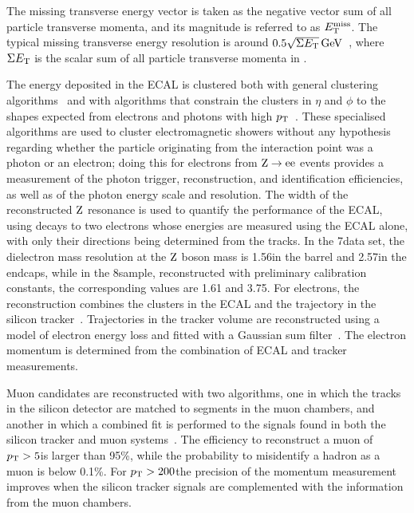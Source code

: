\documentclass[11pt,twoside,a4paper,cmspaper,final]{cms-tdr}
\begin{document}
The missing transverse energy vector is taken as the negative
vector sum of all particle transverse momenta, and its magnitude is
referred to as $E_{\mathrm{T}}^{\text{miss}}$.
The typical missing transverse energy resolution is around
$0.5 \sqrt{\Sigma E_{\mathrm{T}}}\,\text{Ge\hspace{-.08em}V}$~\cite{CMS-JME-10-009}, where $\Sigma E_{\mathrm{T}}$ is the scalar sum of all
particle transverse momenta in \GeVns.

The energy deposited in the ECAL is clustered both with general
clustering algorithms~\cite{CMS-PAS-PFT-10-003} and with algorithms
that constrain the clusters in $\eta$ and $\phi$ to the shapes
expected from electrons and photons with high $p_{\mathrm{T}}$~\cite{CMS-PAS-EGM-10-004}.
These specialised algorithms are used to cluster electromagnetic showers without any
hypothesis regarding whether the particle originating from the interaction point was
a photon or an electron; doing this for electrons from
$\mathrm{Z}\to\mathrm{e}\mathrm{e}$ events provides a measurement of the photon trigger, reconstruction,
and identification efficiencies, as well as of the photon energy scale and resolution.
The width of the reconstructed $\mathrm{Z}$ resonance is used to quantify the
performance of the ECAL, using decays to two electrons whose energies are measured
using the ECAL alone, with only their directions being determined
from the tracks.
In the 7\TeV data set, the dielectron mass resolution at the $\mathrm{Z}$ boson
mass is 1.56\GeV in the barrel and 2.57\GeV in the endcaps, while in
the 8\TeV sample, reconstructed with preliminary calibration
constants, the corresponding values are 1.61 and 3.75\GeV.
For electrons, the reconstruction combines the clusters in the ECAL and the
trajectory in the silicon tracker~\cite{Baffioni:2006cd}.
Trajectories in the tracker volume are reconstructed using a
model of electron energy loss and fitted with a Gaussian sum filter~\cite{Adam2005}.
The electron momentum is determined from the combination of ECAL and tracker
measurements.

Muon candidates are reconstructed with two algorithms, one in
which the tracks in the silicon detector are matched to segments in
the muon chambers, and another in which a combined
fit is performed to the signals found in both the silicon tracker
and muon systems~\cite{CMS-PAS-PFT-10-003}.
The efficiency to reconstruct a muon of $p_{\mathrm{T}} > 5$\GeV is larger than 95\%,
while the probability to misidentify a hadron as a muon is below 0.1\%.
For $p_{\mathrm{T}} > 200$\GeV the precision of the momentum measurement improves
when the silicon tracker signals are complemented with the information from the
muon chambers.
\end{document}
